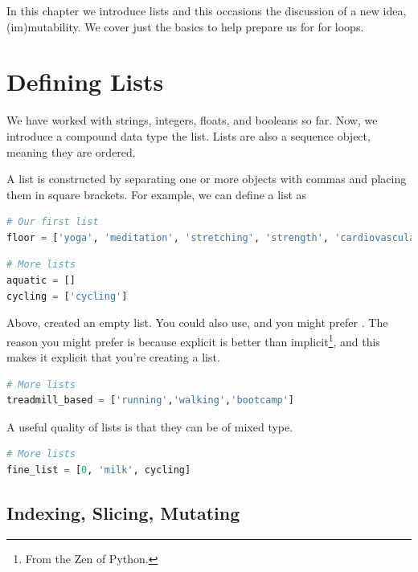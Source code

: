 \noindent {}

In this chapter we introduce lists and this occasions the discussion of a new idea, (im)mutability. We cover just the basics to help prepare us for for loops. %


\section{Defining Lists}

We have worked with strings, integers, floats, and booleans so far. Now, we introduce a compound data type the list.
Lists are also a sequence object, meaning they are ordered. 

A list is constructed by separating one or more objects with commas and placing them in square brackets. For example, 
we can define a list as 

\begin{lstlisting}[language = Python]
# Our first list
floor = ['yoga', 'meditation', 'stretching', 'strength', 'cardiovascular'] \end{lstlisting}


\smallskip

\begin{lstlisting}[language = Python]
# More lists
aquatic = []
cycling = ['cycling'] \end{lstlisting}

Above, \code{[]} created an empty list. You could also use, and you might prefer . The reason you might prefer  is because explicit is better than implicit\footnote{From the Zen of Python.}, and this makes it explicit that you're creating a list.
\smallskip

\begin{lstlisting}[language = Python]
# More lists
treadmill_based = ['running','walking','bootcamp']  \end{lstlisting}

\smallskip

A useful quality of lists is that they can be of mixed type. 


\begin{lstlisting}[language = Python]
# More lists
fine_list = [0, 'milk', cycling]  \end{lstlisting}

\subsection{Indexing, Slicing, Mutating}

